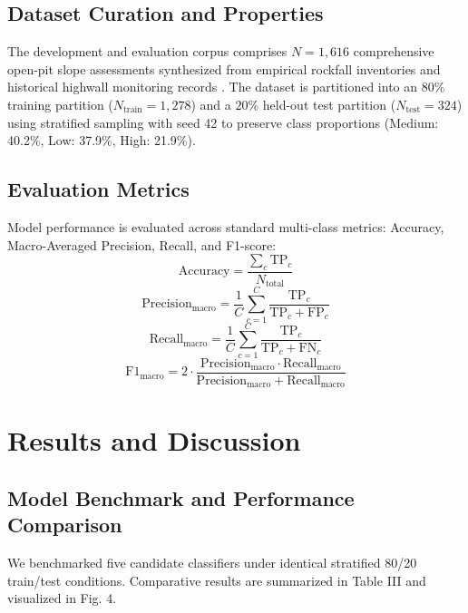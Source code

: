 \documentclass[conference]{IEEEtran}
\begin{document}
\subsection{Dataset Curation and Properties}
The development and evaluation corpus comprises $N = 1,616$ comprehensive open-pit slope assessments synthesized from empirical rockfall inventories and historical highwall monitoring records \cite{bieniawski1989engineering, romana1985slope}. The dataset is partitioned into an $80\%$ training partition ($N_{\text{train}} = 1,278$) and a $20\%$ held-out test partition ($N_{\text{test}} = 324$) using stratified sampling with seed 42 to preserve class proportions (Medium: 40.2\%, Low: 37.9\%, High: 21.9\%).

\subsection{Evaluation Metrics}
Model performance is evaluated across standard multi-class metrics: Accuracy, Macro-Averaged Precision, Recall, and F1-score:
\begin{equation}
\text{Accuracy} = \frac{\sum_{c} \text{TP}_c}{N_{\text{total}}} \label{eq:acc}
\end{equation}
\begin{equation}
\text{Precision}_{\text{macro}} = \frac{1}{C}\sum_{c=1}^C \frac{\text{TP}_c}{\text{TP}_c + \text{FP}_c} \label{eq:prec}
\end{equation}
\begin{equation}
\text{Recall}_{\text{macro}} = \frac{1}{C}\sum_{c=1}^C \frac{\text{TP}_c}{\text{TP}_c + \text{FN}_c} \label{eq:rec}
\end{equation}
\begin{equation}
\text{F1}_{\text{macro}} = 2 \cdot \frac{\text{Precision}_{\text{macro}} \cdot \text{Recall}_{\text{macro}}}{\text{Precision}_{\text{macro}} + \text{Recall}_{\text{macro}}} \label{eq:f1}
\end{equation}

\section{Results and Discussion}

\subsection{Model Benchmark and Performance Comparison}
We benchmarked five candidate classifiers under identical stratified 80/20 train/test conditions. Comparative results are summarized in Table III and visualized in Fig. 4.
\end{document}
